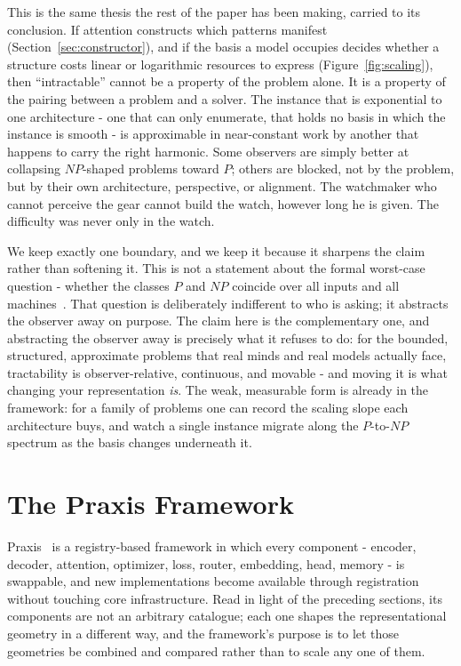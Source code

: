 This is the same thesis the rest of the paper has been making, carried to its conclusion. If attention constructs which patterns manifest (Section~\ref{sec:constructor}), and if the basis a model occupies decides whether a structure costs linear or logarithmic resources to express (Figure~\ref{fig:scaling}), then ``intractable'' cannot be a property of the problem alone. It is a property of the pairing between a problem and a solver. The instance that is exponential to one architecture - one that can only enumerate, that holds no basis in which the instance is smooth - is approximable in near-constant work by another that happens to carry the right harmonic. Some observers are simply better at collapsing $NP$-shaped problems toward $P$; others are blocked, not by the problem, but by their own architecture, perspective, or alignment. The watchmaker who cannot perceive the gear cannot build the watch, however long he is given. The difficulty was never only in the watch.

We keep exactly one boundary, and we keep it because it sharpens the claim rather than softening it. This is not a statement about the formal worst-case question - whether the classes $P$ and $NP$ coincide over all inputs and all machines~\cite{cook1971}. That question is deliberately indifferent to who is asking; it abstracts the observer away on purpose. The claim here is the complementary one, and abstracting the observer away is precisely what it refuses to do: for the bounded, structured, approximate problems that real minds and real models actually face, tractability is observer-relative, continuous, and movable - and moving it is what changing your representation \textit{is}. The weak, measurable form is already in the framework: for a family of problems one can record the scaling slope each architecture buys, and watch a single instance migrate along the $P$-to-$NP$ spectrum as the basis changes underneath it.

\section{The Praxis Framework}
\label{sec:framework}

Praxis~\cite{praxis2025} is a registry-based framework in which every component - encoder, decoder, attention, optimizer, loss, router, embedding, head, memory - is swappable, and new implementations become available through registration without touching core infrastructure. Read in light of the preceding sections, its components are not an arbitrary catalogue; each one shapes the representational geometry in a different way, and the framework's purpose is to let those geometries be combined and compared rather than to scale any one of them.

